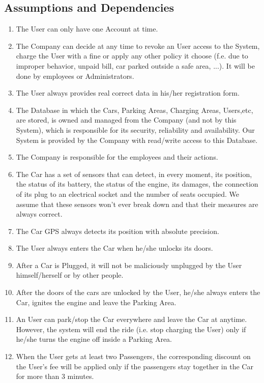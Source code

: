 \subsection{Assumptions and Dependencies}
\begin{enumerate}
	\item The User can only have one Account at time.
	\item The Company can decide at any time to revoke an User access to the System, charge the User with a fine or apply any other policy it choose (f.e. due to improper behavior, unpaid bill, car parked outside a safe area, ...). It will be done by employees or Administrators.
	\item The User always provides real correct data in his/her registration form.
	\item The Database in which the Cars, Parking Areas, Charging Areas, Users,etc, are stored, is owned and managed from the Company (and not by this System), which is responsible for its security, reliability and availability. Our System is provided by the Company with read/write access to this Database.
	\item The Company is responsible for the employees and their actions.
	\item The Car has a set of sensors that can detect, in every moment, its position, the status of its battery, the status of the engine, its damages, the connection of its plug to an electrical socket and the number of seats occupied. We assume that these sensors won't ever break down and that their measures are always correct.
	\item The Car GPS always detects its position with absolute precision.
	\item The User always enters the Car when he/she unlocks its doors.	
	\item After a Car is Plugged, it will not be maliciously unplugged by the User himself/herself or by other people.
	\item After the doors of the cars are unlocked by the User, he/she always enters the Car, ignites the engine and leave the Parking Area.
	\item An User can park/stop the Car everywhere and leave the Car at anytime. However, the system will end the ride (i.e. stop charging the User) only if he/she turns the engine off inside a Parking Area.
	\item When the User gets at least two Passengers, the corresponding discount on the User's fee will be applied only if the passengers stay together in the Car for more than 3 minutes. 

\end{enumerate}
